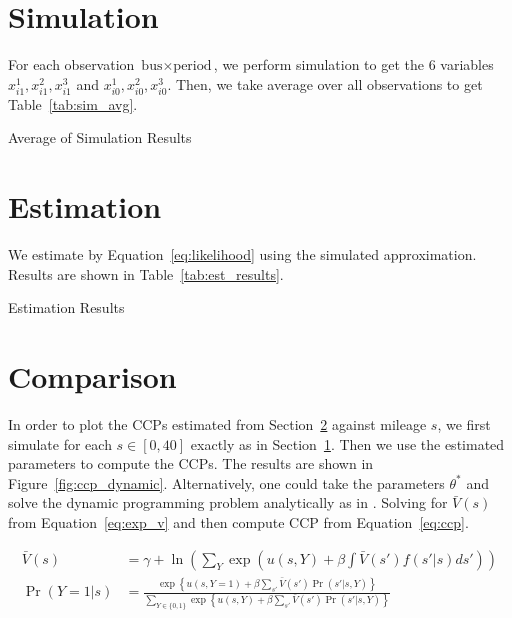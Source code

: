 \documentclass[12pt]{article}[margin=1in]
\begin{document}
\section{Simulation}\label{sec:simulation}
For each observation $\text{bus} \times \text{period}$, we perform simulation
to get the 6 variables $x_{i1}^1,x_{i1}^2,x_{i1}^3$ and
$x_{i0}^1,x_{i0}^2,x_{i0}^3$. Then, we take average over all observations to
get Table~\ref{tab:sim_avg}.

\begin{table}[!htbp]
    \centering
    
    \caption{Average of Simulation Results}
    \label{tab:sim_avg}
\end{table}

\section{Estimation}\label{sec:estimation}
We estimate by Equation~\ref{eq:likelihood} using the simulated approximation.
Results are shown in Table~\ref{tab:est_results}.
\begin{table}[!htbp]
    \centering
    
    \caption{Estimation Results}
    \label{tab:est_results}
\end{table}

\section{Comparison}

In order to plot the CCPs estimated from Section~\ref{sec:estimation} against
mileage $s$, we first simulate for each $s\in [0,40]$ exactly as in
Section~\ref{sec:simulation}. Then we use the estimated parameters to compute
the CCPs. The results are shown in Figure~\ref{fig:ccp_dynamic}. Alternatively,
one could take the parameters $\theta^*$ and solve the dynamic programming
problem analytically as in \citet{rust1987optimal}. Solving for $\bar{V}(s)$
from Equation~\ref{eq:exp_v} and then compute CCP from Equation~\ref{eq:ccp}.

\begin{align}
    \bar{V}(s) & =\gamma+\ln\left(\sum_{Y} \exp\left(u(s,Y)+\beta\int \bar{V}(s') f(s'|s) ds'\right)\right)                                        \label{eq:exp_v}                                     \\
    \Pr(Y=1|s) & =\frac{\exp\left\{ u(s,Y=1) + \beta \sum_{s'}\bar{V}(s') \Pr(s'|s,Y)\right\}}{\sum_{Y \in \{0,1\}} \exp\left\{ u(s,Y) + \beta \sum_{s'}\bar{V}(s') \Pr(s'|s,Y)\right\}} \label{eq:ccp}
\end{align}
\end{document}
